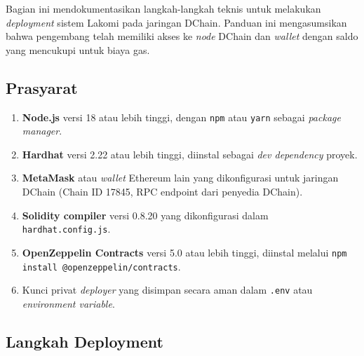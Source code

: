 Bagian ini mendokumentasikan langkah-langkah teknis untuk melakukan \textit{deployment} sistem Lakomi pada jaringan DChain. Panduan ini mengasumsikan bahwa pengembang telah memiliki akses ke \textit{node} DChain dan \textit{wallet} dengan saldo yang mencukupi untuk biaya gas.

\subsection{Prasyarat}

\begin{enumerate}
	\item \textbf{Node.js} versi 18 atau lebih tinggi, dengan \texttt{npm} atau \texttt{yarn} sebagai \textit{package manager}.
	\item \textbf{Hardhat} versi 2.22 atau lebih tinggi, diinstal sebagai \textit{dev dependency} proyek.
	\item \textbf{MetaMask} atau \textit{wallet} Ethereum lain yang dikonfigurasi untuk jaringan DChain (Chain ID 17845, RPC endpoint dari penyedia DChain).
	\item \textbf{Solidity compiler} versi 0.8.20 yang dikonfigurasi dalam \texttt{hardhat.config.js}.
	\item \textbf{OpenZeppelin Contracts} versi 5.0 atau lebih tinggi, diinstal melalui \texttt{npm install @openzeppelin/contracts}.
	\item Kunci privat \textit{deployer} yang disimpan secara aman dalam \texttt{.env} atau \textit{environment variable}.
\end{enumerate}

\subsection{Langkah Deployment}

